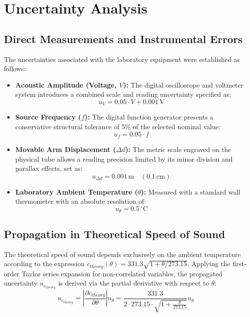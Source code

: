 \documentclass[a4paper,11pt]{article}
\begin{document}
\appendix
\section{Uncertainty Analysis}

\subsection{Direct Measurements and Instrumental Errors}
The uncertainties associated with the laboratory equipment were established as follows:
\begin{itemize}
    \item \textbf{Acoustic Amplitude (Voltage, $V$):} The digital oscilloscope and voltmeter system introduces a combined scale and reading uncertainty specified as:
    \begin{equation}
        u_V = 0.05 \cdot V + 0.001\,\mathrm{V}
    \end{equation}
    \item \textbf{Source Frequency ($f$):} The digital function generator presents a conservative structural tolerance of $5\%$ of the selected nominal value:
    \begin{equation}
        u_f = 0.05 \cdot f
    \end{equation}
    \item \textbf{Movable Arm Displacement ($\Delta d$):} The metric scale engraved on the physical tube allows a reading precision limited by its minor division and parallax effects, set as:
    \begin{equation}
        u_{\Delta d} = 0.001\,\mathrm{m} \quad (0.1\,\mathrm{cm})
    \end{equation}
    \item \textbf{Laboratory Ambient Temperature ($\theta$):} Measured with a standard wall thermometer with an absolute resolution of:
    \begin{equation}
        u_\theta = 0.5\,^{\circ}\mathrm{C}
    \end{equation}
\end{itemize}

\subsection{Propagation in Theoretical Speed of Sound}
The theoretical speed of sound depends exclusively on the ambient temperature according to the expression $c_{theory}(\theta) = 331.3 \sqrt{1 + \theta/273.15}$. Applying the first-order Taylor series expansion for non-correlated variables, the propagated uncertainty $u_{c_{theory}}$ is derived via the partial derivative with respect to $\theta$:
\begin{equation}
    u_{c_{theory}} = \left| \frac{\partial c_{theory}}{\partial \theta} \right| u_\theta = \frac{331.3}{2 \cdot 273.15 \cdot \sqrt{1 + \frac{\theta}{273.15}}} u_\theta
\end{equation}
\end{document}
